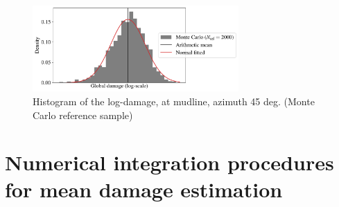\begin{figure}[!h]
\begin{center}
    \includegraphics[width=0.7\textwidth]{part2/figures/DCE/teesside/reference_log_histogramNode1_45.pdf}
\end{center}
\caption{Histogram of the log-damage, at mudline, azimuth 45 deg. (Monte Carlo reference sample)\label{fig:histo_mc}}
\end{figure}

\section{Numerical integration procedures for mean damage estimation}\label{sec3}
